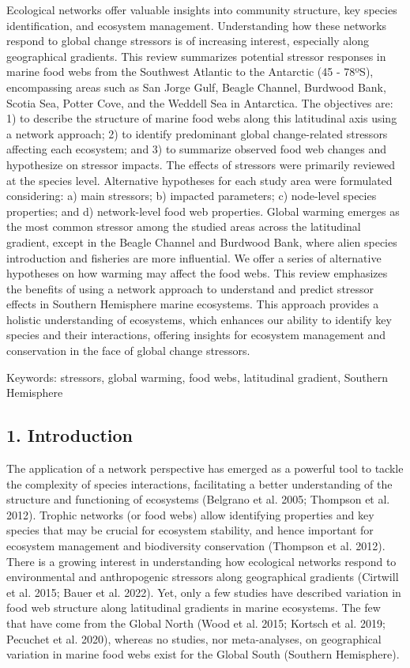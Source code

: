 \documentclass[
]{article}
\begin{document}
Ecological networks offer valuable insights into community structure,
key species identification, and ecosystem management. Understanding how
these networks respond to global change stressors is of increasing
interest, especially along geographical gradients. This review
summarizes potential stressor responses in marine food webs from the
Southwest Atlantic to the Antarctic (45 - 78ºS), encompassing areas such
as San Jorge Gulf, Beagle Channel, Burdwood Bank, Scotia Sea, Potter
Cove, and the Weddell Sea in Antarctica. The objectives are: 1) to
describe the structure of marine food webs along this latitudinal axis
using a network approach; 2) to identify predominant global
change-related stressors affecting each ecosystem; and 3) to summarize
observed food web changes and hypothesize on stressor impacts. The
effects of stressors were primarily reviewed at the species level.
Alternative hypotheses for each study area were formulated considering:
a) main stressors; b) impacted parameters; c) node-level species
properties; and d) network-level food web properties. Global warming
emerges as the most common stressor among the studied areas across the
latitudinal gradient, except in the Beagle Channel and Burdwood Bank,
where alien species introduction and fisheries are more influential. We
offer a series of alternative hypotheses on how warming may affect the
food webs. This review emphasizes the benefits of using a network
approach to understand and predict stressor effects in Southern
Hemisphere marine ecosystems. This approach provides a holistic
understanding of ecosystems, which enhances our ability to identify key
species and their interactions, offering insights for ecosystem
management and conservation in the face of global change stressors.

Keywords: stressors, global warming, food webs, latitudinal gradient,
Southern Hemisphere

\subsection{1. Introduction}\label{introduction}

The application of a network perspective has emerged as a powerful tool
to tackle the complexity of species interactions, facilitating a better
understanding of the structure and functioning of ecosystems (Belgrano
et al. 2005; Thompson et al. 2012). Trophic networks (or food webs)
allow identifying properties and key species that may be crucial for
ecosystem stability, and hence important for ecosystem management and
biodiversity conservation (Thompson et al. 2012). There is a growing
interest in understanding how ecological networks respond to
environmental and anthropogenic stressors along geographical gradients
(Cirtwill et al. 2015; Bauer et al. 2022). Yet, only a few studies have
described variation in food web structure along latitudinal gradients in
marine ecosystems. The few that have come from the Global North (Wood et
al. 2015; Kortsch et al. 2019; Pecuchet et al. 2020), whereas no
studies, nor meta-analyses, on geographical variation in marine food
webs exist for the Global South (Southern Hemisphere).
\end{document}
